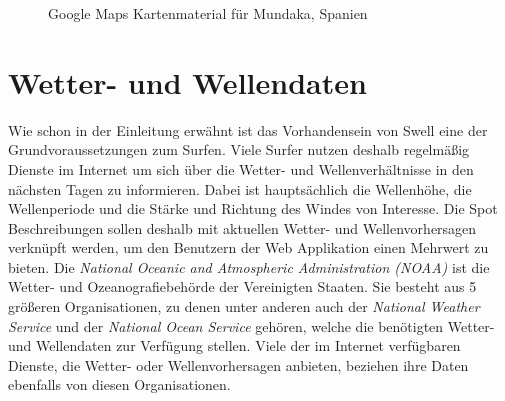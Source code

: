 \begin{figure}[h]
  \caption{Google Maps Kartenmaterial für Mundaka, Spanien}
\end{figure}

\section{Wetter- und Wellendaten}
\label{sec:Wetter- und Wellendaten}

Wie schon in der Einleitung erwähnt ist das Vorhandensein von Swell
eine der Grundvoraussetzungen zum Surfen. Viele Surfer nutzen deshalb
regelmäßig Dienste im Internet um sich über die Wetter- und
Wellenverhältnisse in den nächsten Tagen zu informieren. Dabei ist
hauptsächlich die Wellenhöhe, die Wellenperiode und die Stärke und
Richtung des Windes von Interesse. Die Spot Beschreibungen sollen
deshalb mit aktuellen Wetter- und Wellenvorhersagen verknüpft werden,
um den Benutzern der Web Applikation einen Mehrwert zu bieten. Die
\textit{National Oceanic and Atmospheric Administration (NOAA)} ist
die Wetter- und Ozeanografiebehörde der Vereinigten Staaten. Sie
besteht aus 5 größeren Organisationen, zu denen unter anderen auch der
\textit{National Weather Service} und der \textit{National Ocean
  Service} gehören, welche die benötigten Wetter- und Wellendaten zur
Verfügung stellen. Viele der im Internet verfügbaren Dienste, die
Wetter- oder Wellenvorhersagen anbieten, beziehen ihre Daten ebenfalls
von diesen Organisationen.

